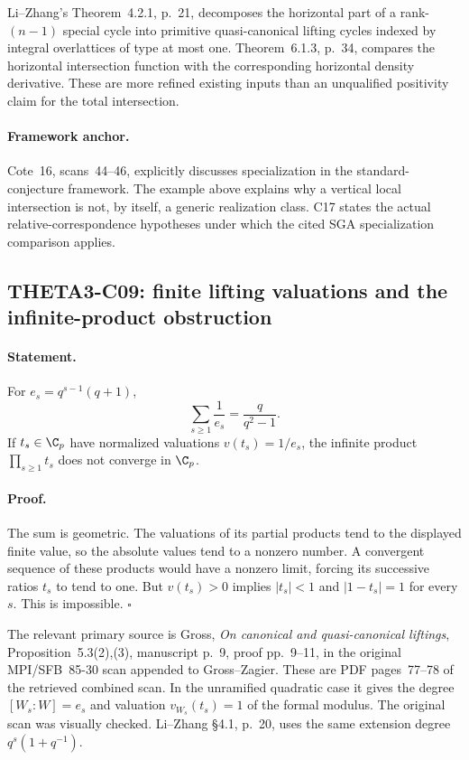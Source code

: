 \documentclass[11pt]{article}
\theoremstyle{definition}\newtheorem{definition}[theorem]{Definition}\newtheorem{remark}[theorem]{Remark}
\begin{document}
Li--Zhang's Theorem~4.2.1, p.~21, decomposes the horizontal part of
a rank-$(n-1)$ special cycle into primitive quasi-canonical lifting
cycles indexed by integral overlattices of type at most one.
Theorem~6.1.3, p.~34, compares the horizontal intersection function
with the corresponding horizontal density derivative. These are
more refined existing inputs than an unqualified positivity claim
for the total intersection.

\paragraph{Framework anchor.}
Cote~16, scans~44--46, explicitly discusses specialization in the
standard-conjecture framework.  The example above explains why a
vertical local intersection is not, by itself, a generic realization
class.  C17 states the actual relative-correspondence hypotheses under
which the cited SGA specialization comparison applies.

\subsection{THETA3-C09: finite lifting valuations and the infinite-product obstruction}\label{C09}

\paragraph{Statement.}
For $e_s=q^{s-1}(q+1)$,
\[
 \sum_{s\geq1}\frac1{e_s}=\frac{q}{q^2-1}.
\]
If $t_s\in\C_p$ have normalized valuations $v(t_s)=1/e_s$, the
infinite product $\prod_{s\geq1}t_s$ does not converge in $\C_p$.

\paragraph{Proof.}
The sum is geometric. The valuations of its partial products tend
to the displayed finite value, so the absolute values tend to a
nonzero number. A convergent sequence of these products would have
a nonzero limit, forcing its successive ratios $t_s$ to tend to
one. But $v(t_s)>0$ implies $|t_s|<1$ and $|1-t_s|=1$ for every
$s$. This is impossible. $\square$

The relevant primary source is Gross, \emph{On canonical and
quasi-canonical liftings}, Proposition~5.3(2),(3), manuscript p.~9,
proof pp.~9--11, in the original MPI/SFB~85-30 scan appended to
Gross--Zagier. These are PDF pages~77--78 of the retrieved combined
scan. In the unramified quadratic case it gives the degree
$[W_s:W]=e_s$ and valuation $v_{W_s}(t_s)=1$ of the formal modulus.
The original scan was visually checked. Li--Zhang \S4.1, p.~20,
uses the same extension degree $q^s(1+q^{-1})$.
\end{document}
